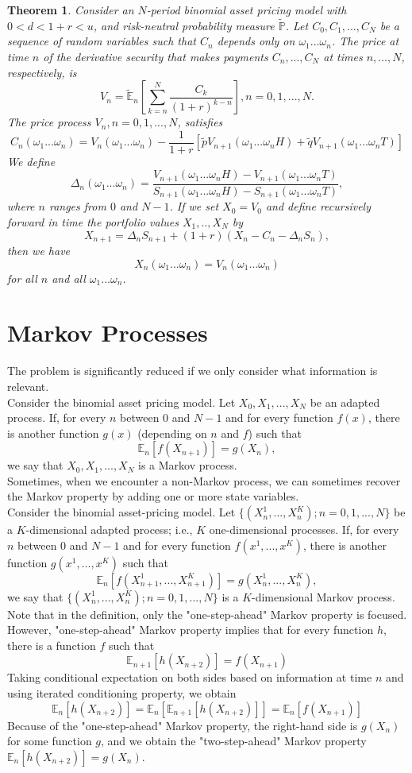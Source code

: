 \documentclass[a4paper]{article}
\newtheorem{thm}{Theorem}
\begin{document}
\begin{thm}
Consider an $N$-period binomial asset pricing model with $0<d<1+r<u$, and risk-neutral probability measure $\tilde{\mathbb{P}}$. Let $C_0,C_1,...,C_N$ be a sequence of random variables such that $C_n$ depends only on $\omega_1...\omega_n$. The price at time $n$ of the derivative security that makes payments $C_n,...,C_N$ at times $n,...,N$, respectively, is 
$$V_n=\tilde{\mathbb{E}}_n\left[\sum_{k=n}^N\frac{C_k}{(1+r)^{k-n}}\right], n=0,1,...,N.$$
The price process $V_n, n=0,1,...,N$, satisfies 
$$C_n(\omega_1...\omega_n) = V_n(\omega_1...\omega_n)-\frac{1}{1+r}\left[\tilde{p}V_{n+1}(\omega_1...\omega_nH)+\tilde{q}V_{n+1}(\omega_1...\omega_nT)\right]$$
We define
$$\Delta_n(\omega_1...\omega_n)=\frac{V_{n+1}(\omega_1...\omega_nH)-V_{n+1}(\omega_1...\omega_nT)}{S_{n+1}(\omega_1...\omega_nH)-S_{n+1}(\omega_1...\omega_nT)},$$
where $n$ ranges from $0$ and $N-1$. If we set $X_0=V_0$ and define recursively forward in time the portfolio values $X_1,..,X_N$ by 
$$X_{n+1}=\Delta_nS_{n+1}+(1+r)(X_n-C_n-\Delta_nS_n),$$
then we have 
$$X_n(\omega_1...\omega_n)=V_n(\omega_1...\omega_n)$$
for all $n$ and all $\omega_1...\omega_n$. 
\end{thm}
\section{Markov Processes}
The problem is significantly reduced if we only consider what information is relevant. \\
Consider the binomial asset pricing model. Let $X_0, X_1,...,X_N$ be an adapted process. If, for every $n$ between $0$ and $N-1$ and for every function $f(x)$, there is another function $g(x)$ (depending on $n$ and $f$) such that
$$\mathbb{E}_n[f(X_{n+1})]=g(X_n),$$
we say that $X_0,X_1,...,X_N$ is a Markov process.\\
Sometimes, when we encounter a non-Markov process, we can sometimes recover the Markov property by adding one or more state variables.\\
Consider the binomial asset-pricing model. Let $\{(X_n^1,...,X_n^K);n=0,1,...,N\}$ be a $K$-dimensional adapted process; i.e., $K$ one-dimensional processes. If, for every $n$ between $0$ and $N-1$ and for every function $f(x^1,...,x^K)$, there is another function $g(x^1,...,x^K)$ such that 
$$\mathbb{E}_n[f(X_{n+1}^1,...,X_{n+1}^K)] = g(X_n^1,...,X_n^K),$$
we say that $\{(X_n^1,...,X_n^K);n=0,1,...,N\}$ is a $K$-dimensional Markov process.\\
Note that in the definition, only the "one-step-ahead" Markov property is focused. However, "one-step-ahead" Markov property implies that for every function $h$, there is a function $f$ such that
$$\mathbb{E}_{n+1}[h(X_{n+2})]=f(X_{n+1})$$
Taking conditional expectation on both sides based on information at time $n$ and using iterated conditioning property, we obtain
$$\mathbb{E}_n[h(X_{n+2})] = 	\mathbb{E}_n[\mathbb{E}_{n+1}[h(X_{n+2})]]=\mathbb{E}_n[f(X_{n+1})]$$
Because of the "one-step-ahead" Markov property, the right-hand side is $g(X_n)$ for some function $g$, and we obtain the "two-step-ahead" Markov property $\mathbb{E}_n[h(X_{n+2})] = g(X_n)$. 
\end{document}
